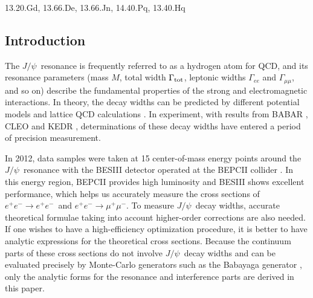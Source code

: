 \documentclass[a4paper,10pt,twoside]{cpc-hepnp}
\newcommand{\jpsi}{$J/\psi$~}
\newcommand{\eetoee}{$e^+e^- \to e^+e^-$~}
\newcommand{\eetomumuwos}{$e^+e^- \to \mu^+\mu^-$}
\newcommand{\Tw}{\Gamma_{\rm tot}}
\newcommand{\Ew}{\Gamma_{ee}}
\newcommand{\Mw}{\Gamma_{\mu\mu}}
\begin{document}
\begin{CJK*}{UTF8}{gbsn}
\begin{pacs}
	13.20.Gd, 13.66.De, 13.66.Jn, 14.40.Pq, 13.40.Hq
\end{pacs}

\footnotetext[0]{\ \\}

\begin{multicols}{2}

\section{Introduction}
%
The \jpsi resonance is frequently referred to as a hydrogen atom for QCD, and its resonance parameters (mass $M$, total width $\Tw$, leptonic widths $\Ew$ and $\Mw$, and so on) describe the fundamental properties of the strong and electromagnetic interactions. In theory, the decay widths can be predicted by different potential \\ models \cite{potential models 1,potential models 2} and lattice QCD calculations \cite{lattice calculations}. In experiment, with results from BABAR \cite{BABAR}, CLEO \cite{CLEO} and KEDR \cite{KEDR}, determinations of these decay widths have entered a period of precision measurement.

In 2012, data samples were taken at 15 center-of-mass energy points around the \jpsi resonance with the BESIII detector \cite{BESIII detector} operated at the BEPCII collider \cite{BESIII detector}. In this energy region, BEPCII provides high luminosity and BESIII shows excellent performance, which helps us accurately measure  the cross sections of \eetoee and \eetomumuwos. To measure \jpsi decay widths, accurate theoretical formulae taking into account higher-order corrections are also needed. If one wishes to have a high-efficiency optimization procedure, it is better to have analytic expressions for the theoretical cross sections. Because the continuum parts of these cross sections do not involve \jpsi decay widths and can be evaluated precisely by Monte-Carlo generators such as the Babayaga generator \cite{BABAYAGA}, only the analytic forms for the resonance and interference parts are derived in this paper.


\end{multicols}
\end{CJK*}
\end{document}
